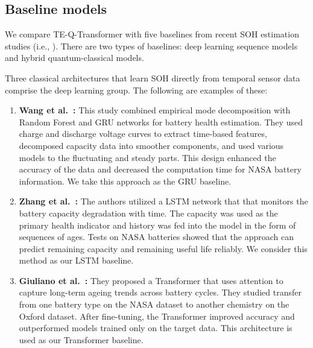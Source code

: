 \documentclass[a4paper,fleqn]{cas-sc}
\begin{document}
\subsection{Baseline models}\label{sec:baselines}
We compare TE-Q-Transformer with five baselines from recent SOH estimation studies (i.e., \citep{wang2024state, zhang2023accurate, giuliano2025transformer, soon2025hybrid, wang2026prediction}). There are two types of baselines: deep learning sequence models and hybrid quantum-classical models. 

Three classical architectures that learn SOH directly from temporal sensor data comprise the deep learning group. The following are examples of these:  
\begin{enumerate}[label=(\roman*)]
  \item \textbf{Wang et al.~\citep{wang2024state}:} This study combined empirical mode decomposition with Random Forest and GRU networks for battery health estimation.  They used charge and discharge voltage curves to extract time-based features, decomposed capacity data into smoother components, and used various models to the fluctuating and steady parts. This design enhanced the accuracy of the data and decreased the computation time for NASA battery information. We take this approach as the GRU baseline.
  \item \textbf{Zhang et al.~\citep{zhang2023accurate}:} The authors utilized a LSTM network that that monitors the battery capacity degradation with time. The capacity was used as the primary health indicator and history was fed into the model in the form of sequences of ages. Tests on NASA batteries showed that the approach can predict remaining capacity and remaining useful life reliably. We consider this method as our LSTM baseline.
  \item \textbf{Giuliano et al.~\citep{giuliano2025transformer}:} They proposed a Transformer that uses attention to capture long-term ageing trends across battery cycles. They studied transfer from one battery type on the NASA dataset to another chemistry on the Oxford dataset. After fine-tuning, the Transformer improved accuracy and outperformed models trained only on the target data. This architecture is used as our Transformer baseline.
\end{enumerate}
\end{document}
